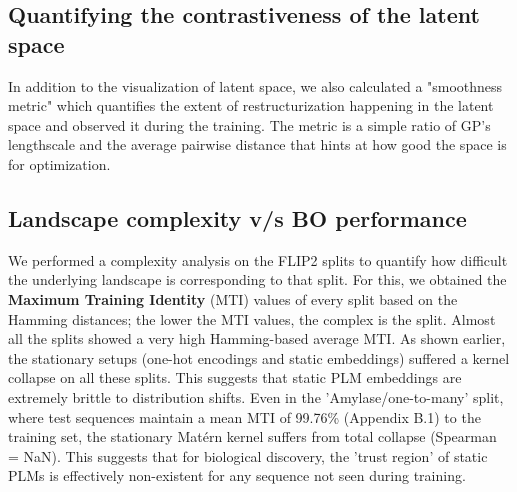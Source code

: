 \documentclass{article}
\theoremstyle{plain}
\theoremstyle{definition}
\theoremstyle{remark}
\begin{document}
\subsection{Quantifying the contrastiveness of the latent space}
In addition to the visualization of latent space, we also calculated a "smoothness metric"  which quantifies the extent of restructurization happening in the latent space and observed it during the training. The metric is a simple ratio of GP's lengthscale and the average pairwise distance that hints at how good the space is for optimization. 

\subsection{Landscape complexity v/s BO performance}
We performed a complexity analysis on the FLIP2 splits to quantify how difficult the underlying landscape is corresponding to that split. For this, we obtained the \textbf{Maximum Training Identity} (MTI) values of every split based on the Hamming distances; the lower the MTI values, the complex is the split. Almost all the splits showed a very high Hamming-based average MTI. As shown earlier, the stationary setups (one-hot encodings and static embeddings) suffered a kernel collapse on all these splits. This suggests that static PLM embeddings are extremely brittle to distribution shifts. Even in the 'Amylase/one-to-many' split, where test sequences maintain a mean MTI of 99.76\% (Appendix B.1) to the training set, the stationary Matérn kernel suffers from total collapse (Spearman = NaN). This suggests that for biological discovery, the 'trust region' of static PLMs is effectively non-existent for any sequence not seen during training. 
\end{document}

